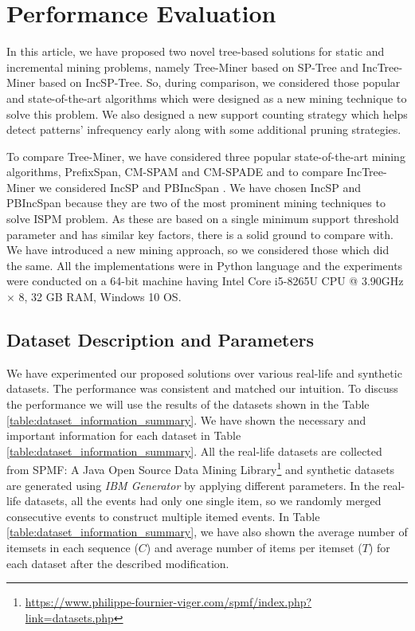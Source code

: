 
\section{Performance Evaluation} \label{evaluation}
In this article, we have proposed two novel tree-based solutions for static and incremental mining problems, namely Tree-Miner based on SP-Tree and IncTree-Miner based on IncSP-Tree. So, during comparison, we considered those popular and state-of-the-art algorithms which were designed as a new mining technique to solve this problem. We also designed a new support counting strategy which helps detect patterns' infrequency early along with some additional pruning strategies.

To compare Tree-Miner, we have considered three popular state-of-the-art mining algorithms, PrefixSpan\cite{han2001prefixspan}, CM-SPAM and CM-SPADE\cite{fournier2014fast} and to compare IncTree-Miner we considered IncSP\cite{lin2004incremental} and PBIncSpan \cite{chen2007incremental}. We have chosen IncSP and PBIncSpan because they are two of the most prominent mining techniques to solve ISPM problem. As these are based on a single minimum support threshold parameter and has similar key factors, there is a solid ground to compare with. We have introduced a new mining approach, so we considered those which did the same. All the implementations were in Python language and the experiments were conducted on a 64-bit machine having Intel Core i5-8265U CPU @ 3.90GHz $\times$ 8, 32 GB RAM, Windows 10 OS.


\subsection{Dataset Description and Parameters}



We have experimented our proposed solutions over various real-life and synthetic datasets. The performance was consistent and matched our intuition.  To discuss the performance we will use the results of the datasets shown in the Table \ref{table:dataset_information_summary}. We have shown the necessary and important information for each dataset in Table \ref{table:dataset_information_summary}. All the real-life datasets are collected from SPMF: A Java Open Source Data Mining Library\footnote{\url{https://www.philippe-fournier-viger.com/spmf/index.php?link=datasets.php}} and synthetic datasets are generated using \textit{IBM Generator} by applying different parameters. In the real-life datasets, all the events had only one single item, so we randomly merged consecutive events to construct multiple itemed events. In Table \ref{table:dataset_information_summary}, we have also shown the average number of itemsets in each sequence ($C$) and average number of items per itemset ($T$) for each dataset after the described modification.

